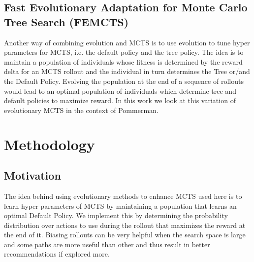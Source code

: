 \documentclass{llncs}
\begin{document}
\subsection{Fast Evolutionary Adaptation for Monte Carlo Tree Search (FEMCTS)}
Another way of combining evolution and MCTS is to use evolution to tune hyper parameters for MCTS, i.e. the default policy and the tree policy. The idea is to maintain a population of individuals whose fitness is determined by the reward delta for an MCTS rollout and the individual in turn determines the Tree or/and the Default Policy. Evolving the population at the end of a sequence of rollouts would lead to an optimal population of individuals which determine tree and default policies to maximize reward. In this work we look at this variation of evolutionary MCTS in the context of Pommerman.

\section{Methodology} \label{sec:meth}

\subsection{Motivation}
The idea behind using evolutionary methods to enhance MCTS used here is to learn hyper-parameters of MCTS by maintaining a population that learns an optimal Default Policy. We implement this by determining the probability distribution over actions to use during the rollout that maximizes the reward at the end of it. Biasing rollouts can be very helpful when the search space is large and some paths are more useful than other and thus result in better recommendations if explored more.
\end{document}
